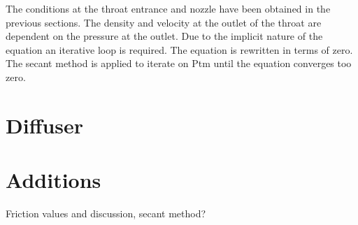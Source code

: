\documentclass[12 pt]{report}
\begin{document}
The conditions at the throat entrance and nozzle have been obtained in the previous sections. The density and velocity at the outlet of the throat are dependent on the pressure at the outlet. Due to the implicit nature of the equation an iterative loop is required. The equation is rewritten in terms of zero. The secant method is applied to iterate on Ptm until the equation converges too zero.

\section{Diffuser}

\section{Additions}
Friction values and discussion, secant method?

\printbibliography
\end{document}
